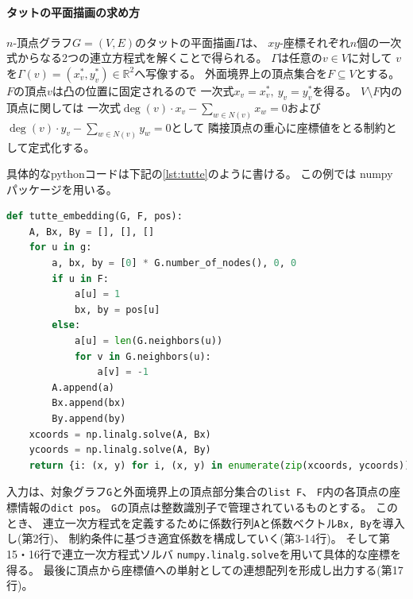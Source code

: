 \paragraph{タットの平面描画の求め方}
$n$-頂点グラフ$G=(V,E)$のタットの平面描画$\Gamma$は、
$xy$-座標それぞれ$n$個の一次式からなる2つの連立方程式を解くことで得られる。
$\Gamma$は任意の$v\in V$に対して
$v$を$\Gamma(v)=(x_v^*, y_v^*) \in \mathbb{R}^2$へ写像する。
外面境界上の頂点集合を$F \subseteq V$とする。
$F$の頂点$v$は凸の位置に固定されるので
一次式$x_v = x_v^*,~ y_v=y_v^*$を得る。
$V \setminus F$内の頂点に関しては
一次式$\deg(v)\cdot x_v - \sum_{w \in N(v)} x_w = 0$および
$\deg(v)\cdot y_v - \sum_{w \in N(v)} y_w = 0$として
隣接頂点の重心に座標値をとる制約として定式化する。


具体的なpythonコードは下記の\lstrefname\ref{lst:tutte}のように書ける。
この例では numpy パッケージを用いる。
\begin{lstlisting}[language=Python, caption=タットの平面描画,label=lst:tutte]
def tutte_embedding(G, F, pos):
    A, Bx, By = [], [], []
    for u in g:
        a, bx, by = [0] * G.number_of_nodes(), 0, 0
        if u in F:
            a[u] = 1
            bx, by = pos[u]
        else:
            a[u] = len(G.neighbors(u))
            for v in G.neighbors(u):
                a[v] = -1
        A.append(a)
        Bx.append(bx)
        By.append(by)
    xcoords = np.linalg.solve(A, Bx)
    ycoords = np.linalg.solve(A, By)
    return {i: (x, y) for i, (x, y) in enumerate(zip(xcoords, ycoords))}
\end{lstlisting}
入力は、対象グラフ{\tt G}と外面境界上の頂点部分集合の{\tt list F}、
{\tt F}内の各頂点の座標情報の{\tt dict pos}。
{\tt G}の頂点は整数識別子で管理されているものとする。
このとき、
連立一次方程式を定義するために係数行列{\tt A}と係数ベクトル{\tt Bx, By}を導入し(第2行)、
制約条件に基づき適宜係数を構成していく(第3-14行)。
そして第15・16行で連立一次方程式ソルバ
{\tt numpy.linalg.solve}を用いて具体的な座標を得る。
最後に頂点から座標値への単射としての連想配列を形成し出力する(第17行)。



